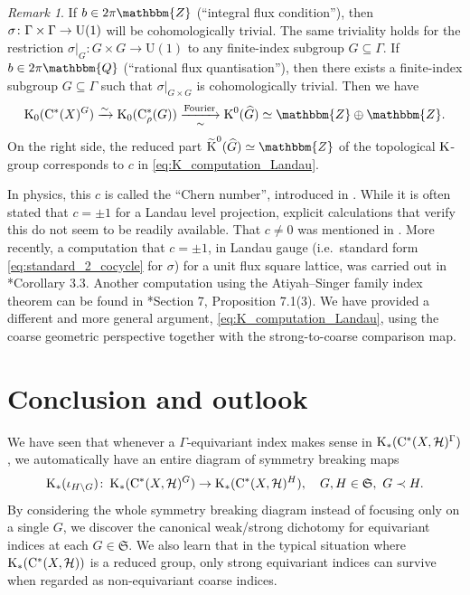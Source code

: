 \documentclass{amsart}
\numberwithin{figure}{section}
\numberwithin{equation}{section}
\numberwithin{table}{section}
\theoremstyle{plain}
\theoremstyle{definition}
\theoremstyle{remark}
\newtheorem{remark}[equation]{Remark}
\theoremstyle{nonumber}
\newcommand{\Z}{\mathbb{Z}}
\newcommand{\Q}{\mathbb{Q}}
\newcommand{\K}{\relax\ifmmode\operatorname{K}\else\textup{K}\fi}
\newcommand{\Cst}{\relax\ifmmode\mathrm{C}^*\else\textup{C*}\fi}
\newcommand{\Cstr}{\Cst_\rho} %
\renewcommand{\mathbb}{\mathbbm} %
\begin{document}
\begin{remark}\label{rem:physics.Chern.Hall}
If $b\in 2\pi \Z$ (``integral flux condition''), then
$\sigma\colon \Gamma\times\Gamma\to{\rm U}(1)$ will be cohomologically trivial.
The same triviality holds for the restriction \( \sigma|_G\colon G\times
G\to\mathrm{U}(1) \) to any finite-index subgroup \( G\subseteq
\Gamma \).
If $b\in 2\pi \Q$ (``rational flux quantisation''),
then there exists a finite-index subgroup \( G\subseteq \Gamma \) such
that \( \sigma|_{G\times G} \) is cohomologically trivial.
Then we have
\[
\K_0(\Cst(X)^G)\xrightarrow{\sim} \K_0(\Cstr(G))
\underset{\sim}{\xrightarrow{\mathrm{Fourier}}}
\K^0(\widehat{G})\simeq\Z\oplus \Z.
\]
On the right side, the reduced part
$\widetilde{\K}^0(\widehat{G})\simeq\Z$ of the topological $\K$-group
corresponds to $c$ in \eqref{eq:K_computation_Landau}. 

In physics, this $c$
is called the ``Chern number'', introduced in
\cite{TKNN:Quantized_Hall_conductance}. While it is often stated that $c=\pm 1$
for a Landau level projection, explicit calculations that verify this do
not seem to be readily available. 
That $c\neq 0$ was  mentioned in 
\cite{Dubrovin-Novikov:Ground_states}.
More recently, a computation that $c=\pm 1$, in
Landau gauge (i.e.~standard form \eqref{eq:standard_2_cocycle} for $\sigma$) for a unit flux square lattice, was carried out in
\cite{dNittis-Gomi-Moscolari:Geometry_non-abelian_Landau_levels}*{Corollary
3.3}. 
Another computation using the Atiyah--Singer family index
theorem can be found in
\cite{Bunke-Ludewig:Breaking_symmetries}*{Section 7, Proposition 7.1(3)}.
We have provided a different and more general argument,
\eqref{eq:K_computation_Landau}, using the coarse geometric perspective
together with the strong-to-coarse comparison map.
\end{remark}

\section{Conclusion and outlook}
We have seen that whenever a $\Gamma$-equivariant index makes sense in $\K_*(\Cst(X,\mathcal{H})^\Gamma)$, we automatically have an entire diagram of symmetry breaking maps
\[
\K_*(\iota_{H\backslash G})\colon \K_*(\Cst(X,\mathcal{H})^G)\to
\K_*(\Cst(X,\mathcal{H})^H),
\quad G,H\in\mathfrak{S},\ G\prec H.
\]
By considering the whole symmetry breaking diagram instead of focusing only on a single $G$, we discover the canonical weak/strong dichotomy for equivariant indices at each $G\in\mathfrak{S}$. We also learn that in the typical situation where $\K_*(\Cst(X,\mathcal{H}))$ is a reduced group, only strong equivariant indices can survive when regarded as non-equivariant coarse indices.
\end{document}
